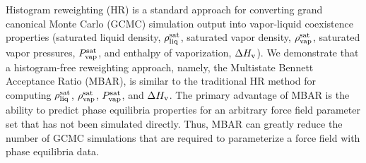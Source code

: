 \documentclass[journal=jced,manuscript=article]{achemso}
\begin{document}



Histogram reweighting (HR) is a standard approach for converting grand canonical Monte Carlo (GCMC) simulation output into vapor-liquid coexistence properties (saturated liquid density, $\rho_{\rm liq}^{\rm sat}$, saturated vapor density, $\rho_{\rm vap}^{\rm sat}$, saturated vapor pressures, $P_{\rm vap}^{\rm sat}$, and enthalpy of vaporization, $\Delta H_{\rm v}$). We demonstrate that a histogram-free reweighting approach, namely, the Multistate Bennett Acceptance Ratio (MBAR), is similar to the traditional HR method for computing $\rho_{\rm liq}^{\rm sat}$, $\rho_{\rm vap}^{\rm sat}$, $P_{\rm vap}^{\rm sat}$, and $\Delta H_{\rm v}$. The primary advantage of MBAR is the ability to predict phase equilibria properties for an arbitrary force field parameter set that has not been simulated directly. Thus, MBAR can greatly reduce the number of GCMC simulations that are required to parameterize a force field with phase equilibria data.
\end{document}
